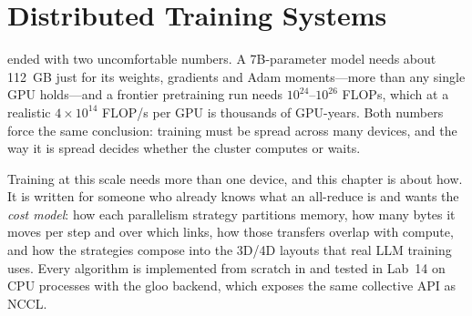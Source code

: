 \chapter{Distributed Training Systems}\label{ch:distributed}

 ended with two uncomfortable numbers. A 7B-parameter model needs about
\SI{112}{GB} just for its weights, gradients and Adam moments---more than any single GPU holds---and
a frontier pretraining run needs $10^{24}$--$10^{26}$ FLOPs, which at a realistic
$4\times10^{14}$ FLOP/s per GPU is thousands of GPU-years. Both numbers force the same
conclusion: training must be spread across many devices, and the way it is spread decides
whether the cluster computes or waits.

Training at this scale needs more than one device, and this chapter is about how. It is written for
someone who already knows what an all-reduce is and wants the \emph{cost model}: how each
parallelism strategy partitions memory, how many bytes it moves per step and over which links,
how those transfers overlap with compute, and how the strategies compose into the 3D/4D
layouts that real LLM training uses. Every algorithm is implemented from scratch in
 and tested in Lab~14 on CPU processes with the gloo backend, which exposes the
same collective API as NCCL.

